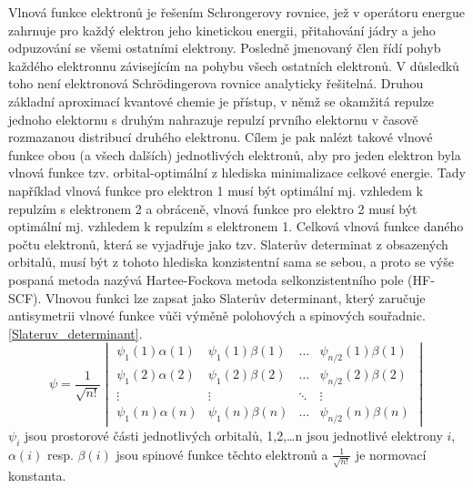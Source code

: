 \documentclass[
  digital, %
  table,   %
  lof,     %
  lot,     %
  oneside,
]{fithesis3}
\begin{document}
Vlnová funkce elektronů je řešením Schrongerovy rovnice, jež v operátoru energue zahrnuje pro každý elektron jeho kinetickou energii, přitahování jádry a jeho odpuzování se všemi ostatními elektrony. Posledně jmenovaný člen řídí pohyb každého elektronnu závisejícím na pohybu všech ostatních elektronů. V důsledků toho není elektronová Schrödingerova rovnice analyticky řešitelná.
Druhou základní aproximací kvantové chemie je přístup, v němž se okamžitá repulze jednoho elektornu s druhým nahrazuje repulzí prvního elektornu v časově rozmazanou distribucí druhého elektronu. Cílem je pak nalézt takové vlnové funkce obou (a všech dalších) jednotlivých elektronů, aby pro jeden elektron byla vlnová funkce tzv. orbital-optimální z hlediska minimalizace celkové energie. Tady například vlnová funkce pro elektron 1 musí být optimální mj. vzhledem k repulzím s elektronem 2 a obráceně, vlnová funkce pro elektro  2 musí být optimální mj. vzhledem k repulzím s elektronem 1. Celková vlnová funkce daného počtu elektronů, která se vyjadřuje jako tzv. Slaterův determinat z obsazených orbitalů, musí být z tohoto hlediska konzistentní sama se sebou, a proto se výše pospaná metoda nazývá Hartee-Fockova metoda selkonzistentního pole (HF-SCF). Vlnovou funkci lze zapsat jako Slaterův determinant, který zaručuje antisymetrii vlnové funkce vůči výměně polohových a spinových souřadnic. \ref{Slateruv_determinant}.
\begin{equation}
\psi =  \frac{1}{\sqrt{n!}}\begin{vmatrix}
\psi_1(1)\alpha(1) & \psi_1(1) \beta (1)  & \dots & \psi_{n/2}(1)\beta(1) \\
\psi_1(2)\alpha(2) & \psi_1(2) \beta (2) & \dots & \psi_{n/2}(2)\beta(2) \\
\vdots             & \vdots                           & \ddots & \vdots \\
\psi_1(n)\alpha(n) & \psi_1(n) \beta (n) & \dots & \psi_{n/2}(n)\beta(n)
\end{vmatrix}
\label{Slateruv_determinant}
\end{equation}
$\psi_i$ jsou prostorové části jednotlivých orbitalů, 1,2,\dots n jsou jednotlivé elektrony $i$, $\alpha(i)$ resp. $\beta(i)$ jsou spinové funkce těchto elektronů a $\frac{1}{\sqrt{n!}}$ je normovací konstanta.
\end{document}
